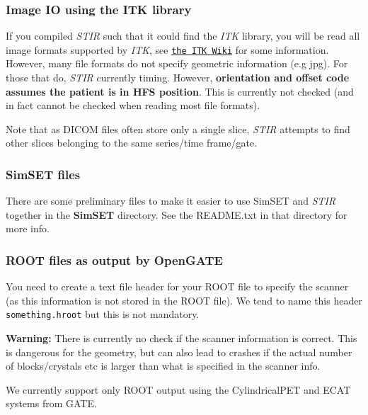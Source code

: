 \documentclass{article}
\def\url#1#2{\mbox{\href{#1}{\tt #2}}}
\begin{document}
\subsubsection{Image IO using the ITK library \label{sec:ITKIO}}
If you compiled \textit{STIR} such that it could find the \textit{ITK} library, you will be read
all image formats supported by \textit{ITK}, see \url{http://www.itk.org/Wiki/ITK/File_Formats}{the ITK Wiki}
for some information. However, many file formats do not specify geometric information (e.g jpg). For those
that do, \textit{STIR} currently timing. However, \textbf{orientation and offset code
assumes the patient is in HFS position}. This is currently not checked (and in fact
cannot be checked when reading most file formats).

Note that as DICOM files often store only a single slice, \textit{STIR} attempts to find
other slices belonging to the same series/time frame/gate.

\subsubsection{SimSET files}
There are some preliminary files to make it easier to use SimSET and \textit{STIR} together in the
\textbf{SimSET} directory. See the README.txt in that directory for more info.

\subsubsection{ROOT files as output by OpenGATE}
You need to create a text file header for your ROOT file
to specify the scanner (as this information is not stored in the ROOT file).
We tend to name this header \texttt{something.hroot} but this is not mandatory.

\textbf{Warning:} There is currently no check if the scanner information is correct. This
  is dangerous for the geometry, but can also lead to crashes if the actual number of 
  blocks/crystals etc is larger than what is specified in the scanner info.

We currently support only ROOT output using the CylindricalPET and ECAT systems
from GATE.
\end{document}
